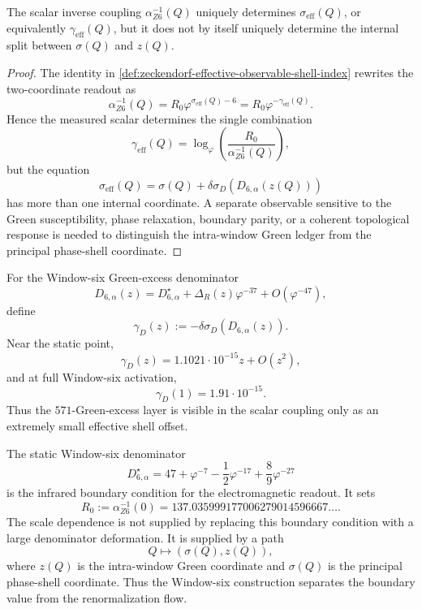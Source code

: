 \begin{theorem}
\label{thm:zeckendorf-observable-shell-compression}
The scalar inverse coupling $\alpha^{-1}_{Z6}(Q)$ uniquely determines
$\sigma_{\mathrm{eff}}(Q)$, or equivalently
$\gamma_{\mathrm{eff}}(Q)$, but it does not by itself uniquely determine
the internal split between $\sigma(Q)$ and $z(Q)$.
\end{theorem}
\begin{proof}
The identity in
\autoref{def:zeckendorf-effective-observable-shell-index} rewrites the
two-coordinate readout as
$$
  \alpha^{-1}_{Z6}(Q)
  =
  R_0\varphi^{\sigma_{\mathrm{eff}}(Q)-6}
  =
  R_0\varphi^{-\gamma_{\mathrm{eff}}(Q)}.
$$
Hence the measured scalar determines the single combination
$$
  \gamma_{\mathrm{eff}}(Q)
  =
  \log_\varphi
  \left(
    \frac{R_0}{\alpha^{-1}_{Z6}(Q)}
  \right),
$$
but the equation
$$
  \sigma_{\mathrm{eff}}(Q)
  =
  \sigma(Q)+\delta\sigma_D(D_{6,\alpha}(z(Q)))
$$
has more than one internal coordinate. A separate observable sensitive
to the Green susceptibility, phase relaxation, boundary parity, or a
coherent topological response is needed to distinguish the intra-window
Green ledger from the principal phase-shell coordinate.
\end{proof}

\begin{corollary}
\label{cor:zeckendorf-green-excess-effective-shell-offset}
For the Window-six Green-excess denominator
$$
  D_{6,\alpha}(z)
  =
  D_{6,\alpha}^{\star}
  +
  \Delta_R(z)\varphi^{-37}
  +
  O(\varphi^{-47}),
$$
define
$$
  \gamma_D(z)
  :=
  -\delta\sigma_D(D_{6,\alpha}(z)).
$$
Near the static point,
$$
  \gamma_D(z)
  =
  1.1021\cdot10^{-15}z
  +
  O(z^2),
$$
and at full Window-six activation,
$$
  \gamma_D(1)
  =
  1.91\cdot10^{-15}.
$$
Thus the $571$-Green-excess layer is visible in the scalar coupling only
as an extremely small effective shell offset.
\end{corollary}

\begin{principle}
\label{prin:zeckendorf-infrared-boundary-condition-shell-flow}
The static Window-six denominator
$$
  D_{6,\alpha}^{\star}
  =
  47+\varphi^{-7}-\frac12\varphi^{-17}
  +\frac89\varphi^{-27}
$$
is the infrared boundary condition for the electromagnetic readout. It
sets
$$
  R_0
  :=
  \alpha_{Z6}^{-1}(0)
  =
  137.035999177006279014596667\ldots.
$$
The scale dependence is not supplied by replacing this boundary
condition with a large denominator deformation. It is supplied by a
path
$$
  Q\longmapsto(\sigma(Q),z(Q)),
$$
where $z(Q)$ is the intra-window Green coordinate and $\sigma(Q)$ is the
principal phase-shell coordinate. Thus the Window-six construction
separates the boundary value from the renormalization flow.
\end{principle}

